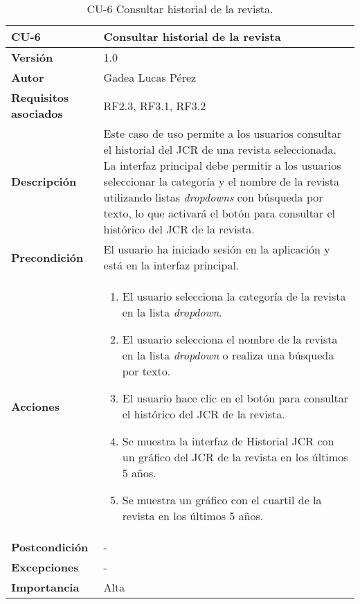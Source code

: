 \begin{table}[p]
\centering
\begin{tabularx}{\linewidth}{ p{} p{} }
\toprule
\textbf{CU-6} & \textbf{Consultar historial de la revista}\\
\toprule
\textbf{Versión} & 1.0 \\
\textbf{Autor} & Gadea Lucas Pérez \\
\textbf{Requisitos asociados} & RF2.3, RF3.1, RF3.2 \\
\textbf{Descripción} & Este caso de uso permite a los usuarios consultar el historial del JCR de una revista seleccionada. La interfaz principal debe permitir a los usuarios seleccionar la categoría y el nombre de la revista utilizando listas \textit{dropdowns} con búsqueda por texto, lo que activará el botón para consultar el histórico del JCR de la revista. \\
\textbf{Precondición} & El usuario ha iniciado sesión en la aplicación y está en la interfaz principal.\\
\textbf{Acciones} &
\begin{enumerate}
\def\labelenumi{\arabic{enumi}.}
\tightlist
\item El usuario selecciona la categoría de la revista en la lista \textit{dropdown}.
\item El usuario selecciona el nombre de la revista en la lista \textit{dropdown} o realiza una búsqueda por texto.
\item El usuario hace clic en el botón para consultar el histórico del JCR de la revista.
\item Se muestra la interfaz de Historial JCR con un gráfico del JCR de la revista en los últimos 5 años.
\item Se muestra un gráfico con el cuartil de la revista en los últimos 5 años.
\end{enumerate}\\
\textbf{Postcondición} & - \\
\textbf{Excepciones} & - \\
\textbf{Importancia} & Alta\\
\bottomrule
\end{tabularx}
\caption{CU-6 Consultar historial de la revista.}
\label{tab:cu6}
\end{table}


